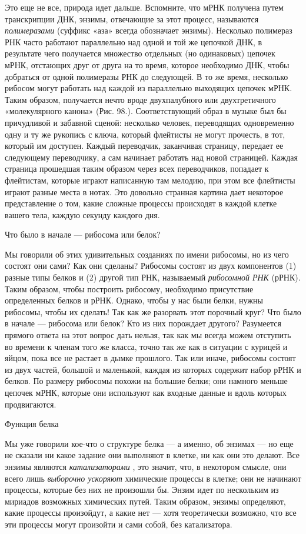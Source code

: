 Это еще не все, природа идет дальше. Вспомните, что мРНК получена путем транскрипции ДНК, энзимы, отвечающие за этот процесс, называются \emph{полимеразами} (суффикс «аза» всегда обозначает энзимы). Несколько полимераз РНК часто работают параллельно над одной и той же цепочкой ДНК, в результате чего получается множество отдельных (но одинаковых) цепочек мРНК, отстающих друг от друга на то время, которое необходимо ДНК, чтобы добраться от одной полимеразы РНК до следующей. В то же время, несколько рибосом могут работать над каждой из параллельно выходящих цепочек мРНК. Таким образом, получается нечто вроде двухпалубного или двухтретичного «молекулярного канона» (Рис. 98.). Соответствующий образ в музыке был бы причудливой и забавной сценой: несколько человек, переводящих одновременно одну и ту же рукопись с ключа, который флейтисты не могут прочесть, в тот, который им доступен. Каждый переводчик, заканчивая страницу, передает ее следующему переводчику, а сам начинает работать над новой страницей. Каждая страница прошедшая таким образом через всех переводчиков, попадает к флейтистам, которые играют написанную там мелодию, при этом все флейтисты играют разные места в нотах. Это довольно странная картина дает некоторое представление о том, какие сложные процессы происходят в каждой клетке вашего тела, каждую секунду каждого дня.

Что было в начале --- рибосома или белок?

Мы говорили об этих удивительных созданиях по имени рибосомы, но из чего состоят они сами? Как они сделаны? Рибосомы состоят из двух компонентов (1) разные типы белков и (2) другой тип РНК, называемый \emph{рибосомной РНК} (рРНК). Таким образом, чтобы построить рибосому, необходимо присутствие определенных белков и рРНК. Однако, чтобы у нас были белки, нужны рибосомы, чтобы их сделать! Так как же разорвать этот порочный круг? Что было в начале --- рибосома или белок? Кто из них порождает другого? Разумеется прямого ответа на этот вопрос дать нельзя, так как мы всегда можем отступить во времени к членам того же класса, точно так же как в ситуации с курицей и яйцом, пока все не растает в дымке прошлого. Так или иначе, рибосомы состоят из двух частей, большой и маленькой, каждая из которых содержит набор рРНК и белков. По размеру рибосомы похожи на большие белки; они намного меньше цепочек мРНК, которые они используют как входные данные и вдоль которых продвигаются.

Функция белка

Мы уже говорили кое-что о структуре белка --- а именно, об энзимах --- но еще не сказали ни какое задание они выполняют в клетке, ни как они это делают. Все энзимы являются \emph{катализаторами} , это значит, что, в некотором смысле, они всего лишь \emph{выборочно ускоряют} химические процессы в клетке; они не начинают процессы, которые без них не произошли бы. Энзим идет по нескольким из мириадов возможных химических путей. Таким образом, энзимы определяют, какие процессы произойдут, а какие нет --- хотя теоретически возможно, что все эти процессы могут произойти и сами собой, без катализатора.

